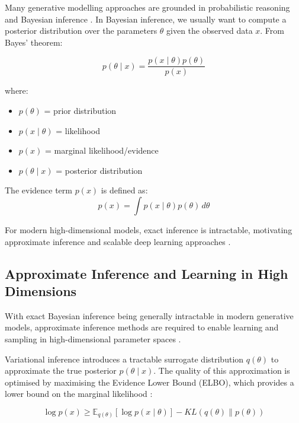 \documentclass[a4paper,twoside,12pt]{report}
\begin{document}
Many generative modelling approaches are grounded in probabilistic reasoning and Bayesian inference \citep{mackay2003information}. In Bayesian inference, we usually want to compute a posterior distribution over the parameters \(\theta\) given the observed data \(x\). From Bayes’ theorem:

\begin{equation}
    p(\theta \mid x) = \frac{p(x \mid \theta)p(\theta)}{p(x)}
\end{equation}

where:
\begin{itemize}
    \item \(p(\theta)\) = prior distribution
    \item \(p(x \mid \theta)\) = likelihood
    \item \(p(x)\) = marginal likelihood/evidence
    \item \(p(\theta \mid x)\) = posterior distribution
\end{itemize}

The evidence term \(p(x)\) is defined as:
\begin{equation}
    p(x) = \int p(x \mid \theta)p(\theta)\,d\theta
\end{equation}

For modern high-dimensional models, exact inference is intractable, motivating approximate inference and scalable deep learning approaches \citep{blei2017variational, murphy2022probabilistic}.


\subsection{Approximate Inference and Learning in High Dimensions}

With exact Bayesian inference being generally intractable in modern generative models, approximate inference methods are required to enable learning and sampling in high-dimensional parameter spaces \citep{mackay2003information, bishop2006pattern, murphy2022probabilistic}.

Variational inference introduces a tractable surrogate distribution \(q(\theta)\) to approximate the true posterior \(p(\theta \mid x)\). The quality of this approximation is optimised by maximising the Evidence Lower Bound (ELBO), which provides a lower bound on the marginal likelihood \citep{blei2017variational, kingma2013auto}:

\begin{equation}
\log p(x) \geq \mathbb{E}_{q(\theta)}[\log p(x \mid \theta)] - KL(q(\theta)\|p(\theta))
\end{equation}
\end{document}

